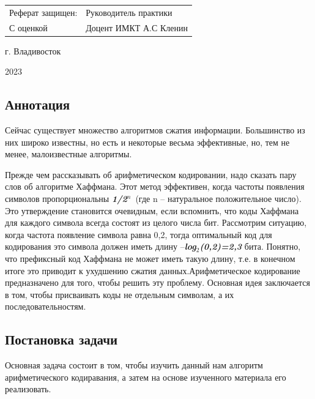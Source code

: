 \documentclass[12pt]{article}
\begin{document}
\begin{titlepage}
\begin{small}
\vfill
\noindent
\begin{tabular}{p{} p{}}
 Реферат защищен:& Руководитель практики  \\
 С оценкой \hrulefill & Доцент ИМКТ А.С Кленин  \\
 
\end{tabular}

\noindent


\vfill

\centerline{г. Владивосток}
\centerline{2023}
\clearpage
\end{small}
\end{titlepage}
\newpage


\begin{center}
   \section*{Аннотация} 
\end{center}

Сейчас существует множество алгоритмов сжатия информации. Большинство из них широко известны, но есть и некоторые весьма эффективные, но, тем не менее, малоизвестные алгоритмы.

Прежде чем рассказывать об арифметическом кодировании, надо сказать пару слов об алгоритме Хаффмана. Этот метод эффективен, когда частоты появления символов пропорциональны \textbf{\textit{1/2${}^{n}$}}~(где n -- натуральное положительное число). Это утверждение становится очевидным, если вспомнить, что коды Хаффмана для каждого символа всегда состоят из целого числа бит. Рассмотрим ситуацию, когда частота появление символа равна 0,2, тогда оптимальный код для кодирования это символа должен иметь длину --\textbf{\textit{log${}_{2}$(0,2)=2,3}} бита. Понятно, что префиксный код Хаффмана не может иметь такую длину, т.е. в конечном итоге это приводит к ухудшению сжатия данных.Арифметическое кодирование предназначено для того, чтобы решить эту проблему. Основная идея заключается в том, чтобы присваивать коды не отдельным символам, а их последовательностям.\newpage

\begin{center}
   \section*{Постановка задачи} 
\end{center}

Основная задача состоит в том, чтобы изучить данный нам алгоритм арифметического кодиравания, а затем на основе изученного материала его реализовать.
\end{document}

